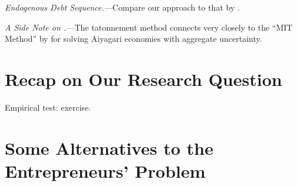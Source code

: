 \documentclass[twoside,11pt,leqno]{article}
\begin{document}
\textit{Endogenous Debt Sequence.---}Compare our approach to that by \citet{Acikgozetal:2018}.

\textit{A Side Note on \citet{Boppartetal:2018}.---}The tatonnement method connects very closely to the ``MIT Method'' by \citet{Boppartetal:2018} for solving Aiyagari economies with aggregate uncertainty. 

\section{Recap on Our Research Question}

Empirical test: \citet{RajanZingales:1998} exercise.

\section{Some Alternatives to the Entrepreneurs' Problem}




\end{document}
